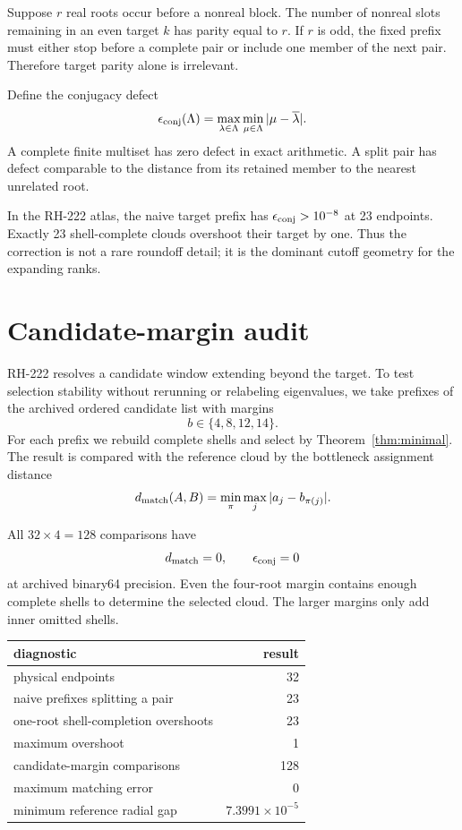 \documentclass[11pt]{article}
\theoremstyle{remark}\newtheorem{remark}[theorem]{Remark}
\begin{document}
Suppose $r$ real roots occur before a nonreal block. The number of nonreal
slots remaining in an even target $k$ has parity equal to $r$. If $r$ is
odd, the fixed prefix must either stop before a complete pair or include one
member of the next pair. Therefore target parity alone is irrelevant.

Define the conjugacy defect
\begin{equation}\label{eq:defect}
 \epsilon_{\rm conj}(\Lambda)
 =\max_{\lambda\in\Lambda}
   \min_{\mu\in\Lambda}|\mu-\overline\lambda|.
\end{equation}
A complete finite multiset has zero defect in exact arithmetic. A split pair
has defect comparable to the distance from its retained member to the nearest
unrelated root.

In the RH-222 atlas, the naive target prefix has
$\epsilon_{\rm conj}>10^{-8}$ at 23 endpoints. Exactly 23 shell-complete
clouds overshoot their target by one. Thus the correction is not a rare
roundoff detail; it is the dominant cutoff geometry for the expanding ranks.

\section{Candidate-margin audit}

RH-222 resolves a candidate window extending beyond the target. To test
selection stability without rerunning or relabeling eigenvalues, we take
prefixes of the archived ordered candidate list with margins
\begin{equation}
 b\in\{4,8,12,14\}.
\end{equation}
For each prefix we rebuild complete shells and select by
Theorem~\ref{thm:minimal}. The result is compared with the reference cloud by
the bottleneck assignment distance
\begin{equation}\label{eq:match}
 d_{\rm match}(A,B)=
 \min_{\pi}\max_j|a_j-b_{\pi(j)}|.
\end{equation}

All $32\times4=128$ comparisons have
\[
 d_{\rm match}=0,\qquad \epsilon_{\rm conj}=0
\]
at archived binary64 precision. Even the four-root margin contains enough
complete shells to determine the selected cloud. The larger margins only
add inner omitted shells.

\begin{center}
\begin{tabular}{lr}
\toprule
diagnostic & result\\
\midrule
physical endpoints & 32\\
naive prefixes splitting a pair & 23\\
one-root shell-completion overshoots & 23\\
maximum overshoot & 1\\
candidate-margin comparisons & 128\\
maximum matching error & 0\\
minimum reference radial gap & $7.3991\times10^{-5}$\\
\bottomrule
\end{tabular}
\end{center}
\end{document}
